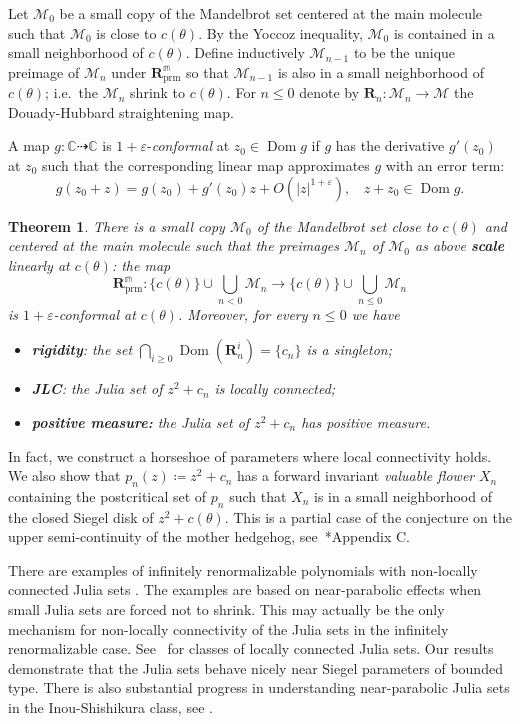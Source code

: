 \documentclass{amsart}
\newcommand{\Dom}{\operatorname {Dom}}
\renewcommand{\sp}{{\ \ }}
\newcommand{\1}{{\mathbb 1 }}
\newcommand{\Mandel}{{\mathcal{M}}}
\newcommand\mRR{\boldsymbol R}%
\newcommand\prm{{\operatorname{prm}}}
\newcommand\mRRc{ \boldsymbol R_{\prm}}%
\newcommand{\mm}{\mathbb{m}}
\newcommand{\C}{\mathbb{C}}
\newtheorem{thm}{Theorem}[section]
\theoremstyle{remark}
\numberwithin{equation}{section}
\theoremstyle{definition}
\theoremstyle{nonumberbreak}
\begin{document}
Let $\Mandel_0$ be a small copy of the Mandelbrot set centered at the main molecule such that $\Mandel_0$ is close to $c(\theta)$. By the Yoccoz inequality, $\Mandel_0$ is contained in a small neighborhood of  $c(\theta)$. Define inductively $\Mandel_{n-1}$ to be the unique preimage of $\Mandel_{n}$ under $\mRRc^\mm$ so that $\Mandel_{n-1}$  is also in a small neighborhood of  $c(\theta)$; i.e.~the $\Mandel_n$ shrink to $c(\theta)$. For $n\le 0$ denote by $\mRR_n\colon \Mandel_n\to \Mandel$ the Douady-Hubbard straightening map.


A map $g\colon \C\dashrightarrow \C$ is $1+\varepsilon$-\emph{conformal} at $z_0\in \Dom g$ if $g$ has the derivative $g'(z_0)$ at $z_0$ such that the corresponding linear map approximates $g$ with an error term:
\[g(z_0+z)=g(z_0)+ g'(z_0) z +O(|z|^{1+\varepsilon}),\sp\sp z+z_0\in \Dom g.\] 


\begin{thm}
\label{thm:main}
 There is a small copy $\Mandel_0$ of the Mandelbrot set close to $c(\theta)$ and centered at the main molecule such that the preimages $\Mandel_n$ of $\Mandel_0$ as above {\bf scale} linearly at $c(\theta)$: the map
\begin{equation}
\label{eq:thm:main}
\mRRc^\mm\colon \{c(\theta)\}\cup \bigcup_{n<0} \Mandel_n  \to \{c(\theta)\}\cup  \bigcup_{n\le 0} \Mandel_n
\end{equation}
is $1+\varepsilon$-conformal at $c(\theta)$. Moreover, for every $n\le 0$ we have
\begin{itemize}
\item {\bf rigidity}: the set $\displaystyle{\bigcap _{i\ge 0}\Dom (\mRR^i_n)}=\{c_n\}$ is a singleton; 
\item {\bf JLC}: the Julia set of $z^2+c_n$ is locally connected;
\item  {\bf positive measure:} the Julia set of $z^2+c_n$ has positive measure.
\end{itemize}
\end{thm}


 In fact, we construct a horseshoe of parameters where local connectivity holds. We also show that $p_n(z)\coloneqq z^2+c_n$ has a forward invariant \emph{valuable flower} $X_n$ containing the postcritical set of $p_n$ such that $X_n$ is in a small neighborhood of the closed Siegel disk of $z^2+c(\theta)$. This is a partial case of the conjecture on the upper semi-continuity of the mother hedgehog, see~\cite{DLS}*{Appendix C}.
 

There are examples of infinitely renormalizable polynomials with non-locally connected Julia sets \cite{Mi}. The examples are based on near-parabolic effects when small Julia sets are forced not to shrink. This may actually be the only mechanism for non-locally connectivity of the Julia sets in the infinitely renormalizable case. See~\cites{Hu, Mi, J,McM2, L:acta, KL1, KL2} for classes of locally connected Julia sets. Our results demonstrate that the Julia sets behave nicely near Siegel parameters of bounded type. There is also  substantial progress in understanding near-parabolic Julia sets in the Inou-Shishikura class, see  \cites{CS,SY, Che }. 
\end{document}

